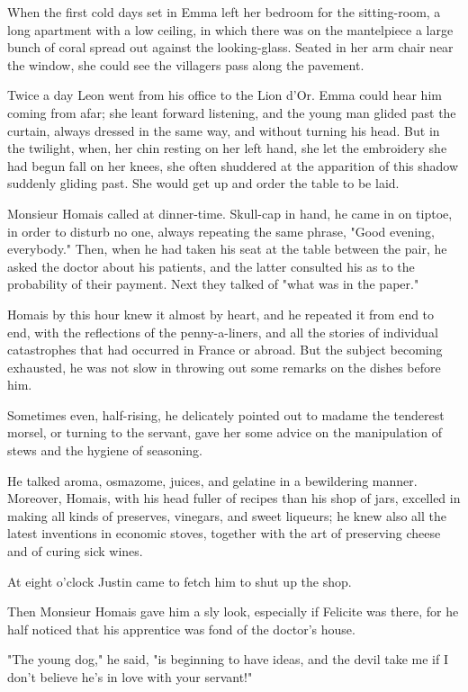 \documentclass{tufte-book}
\begin{document}
When the first cold days set in Emma left her bedroom for the
sitting-room, a long apartment with a low ceiling, in which there was
on the mantelpiece a large bunch of coral spread out against the
looking-glass. Seated in her arm chair near the window, she could see
the villagers pass along the pavement.

Twice a day Leon went from his office to the Lion d'Or. Emma could hear
him coming from afar; she leant forward listening, and the young man
glided past the curtain, always dressed in the same way, and without
turning his head. But in the twilight, when, her chin resting on her
left hand, she let the embroidery she had begun fall on her knees, she
often shuddered at the apparition of this shadow suddenly gliding past.
She would get up and order the table to be laid.

Monsieur Homais called at dinner-time. Skull-cap in hand, he came in on
tiptoe, in order to disturb no one, always repeating the same phrase,
"Good evening, everybody." Then, when he had taken his seat at the table
between the pair, he asked the doctor about his patients, and the latter
consulted his as to the probability of their payment. Next they talked
of "what was in the paper."

Homais by this hour knew it almost by heart, and he repeated it from end
to end, with the reflections of the penny-a-liners, and all the stories
of individual catastrophes that had occurred in France or abroad. But
the subject becoming exhausted, he was not slow in throwing out some
remarks on the dishes before him.

Sometimes even, half-rising, he delicately pointed out to madame the
tenderest morsel, or turning to the servant, gave her some advice on the
manipulation of stews and the hygiene of seasoning.

He talked aroma, osmazome, juices, and gelatine in a bewildering manner.
Moreover, Homais, with his head fuller of recipes than his shop of jars,
excelled in making all kinds of preserves, vinegars, and sweet liqueurs;
he knew also all the latest inventions in economic stoves, together with
the art of preserving cheese and of curing sick wines.

At eight o'clock Justin came to fetch him to shut up the shop.

Then Monsieur Homais gave him a sly look, especially if Felicite was
there, for he half noticed that his apprentice was fond of the doctor's
house.

"The young dog," he said, "is beginning to have ideas, and the devil
take me if I don't believe he's in love with your servant!"
\end{document}
